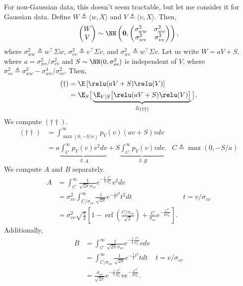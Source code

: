 \documentclass{article}
\begin{document}
For non-Gaussian data, this doesn't seem tractable, but let me consider it for Gaussian data.
Define $W \triangleq \langle w, X \rangle$ and $V \triangleq \langle v, X \rangle$.
Then,
\begin{align}
   \begin{pmatrix} W \\ V \end{pmatrix} \sim \NN\left( \mathbf{0}, \begin{pmatrix} \sigma_{ww}^2 & \sigma_{wv}^2 \\ \sigma_{wv}^2 & \sigma_{vv}^2 \end{pmatrix} \right),
\end{align}
where $\sigma_{ww}^2 \triangleq w^\top \Sigma w$, $\sigma_{vv}^2 \triangleq v^\top \Sigma v$, and $\sigma_{wv}^2 \triangleq w^\top \Sigma v$.
Let us write $W = a V + S$, where $a = \sigma_{wv}^2 / \sigma_{vv}^2$ and $S \sim \NN(0, \sigma_{ss}^2)$ is independent of $V$, where $\sigma_{ss}^2 \triangleq \sigma_{ww}^2 - \sigma_{wv}^4 / \sigma_{vv}^2$.
Then,
\begin{align}
    (\dagger) 
    &= \E \left[ \relu(aV + S) \relu(V) \right] \\
    &= \E_S \big[ \underbrace{ \E_{V \mid S} \big[ \relu(aV + S) \relu(V) \big] }_{\triangleq (\dagger \dagger)} \big].
\end{align}
We compute $(\dagger \dagger)$.
\begin{align*}
    (\dagger \dagger)
    &= \int_{ \max(0, -S/a) }^{\infty} p_V(v) (av + S) v dv \\
    &= a \underbrace{ \int_{ C }^{\infty} p_V(v) v^2 dv }_{\triangleq A} + S \underbrace{ \int_{ C }^{\infty} p_V(v) v dv }_{\triangleq B}. & C \triangleq \max(0, -S/a)
\end{align*}
We compute $A$ and $B$ separately.
\begin{align*}
    A 
    &= \int_{ C }^{\infty} \frac{1}{\sqrt{2\pi} \sigma_{vv}} e^{-\frac{1}{2} \frac{v^2}{\sigma_{vv}^2} } v^2 dv \\
    &= \sigma_{vv}^2 \int_{ C / \sigma_{vv} }^{\infty} \frac{1}{\sqrt{2\pi}} e^{-\frac{1}{2} t^2 } t^2 dt & t = v / \sigma_{vv} \\
    &= \sigma_{vv}^2 \sqrt{\frac{\pi}{2}} \left[ 1 - \operatorname{erf}\left(\frac{ C / \sigma_{vv} }{\sqrt{2}}\right) + \frac{C}{\sigma_{vv}} e^{-\frac{C^2}{2 \sigma_{vv}^2}} \right].
\end{align*}
Additionally,
\begin{align*}
    B 
    &= \int_{ C }^{\infty} \frac{1}{\sqrt{2\pi} \sigma_{vv}} e^{-\frac{1}{2} \frac{v^2}{\sigma_{vv}^2} } v dv \\
    &= \int_{ C / \sigma_{vv} }^{\infty} \frac{1}{\sqrt{2\pi}} e^{-\frac{1}{2} t^2 } t dt & t = v / \sigma_{vv} \\
    &= \frac{\sigma_{vv}}{\sqrt{2\pi}} e^{-\frac{1}{2} \frac{v^2}{\sigma_{vv}^2} } v e^{ -\frac{C^2}{2 \sigma_{vv}^2} }.
\end{align*}
\end{document}
